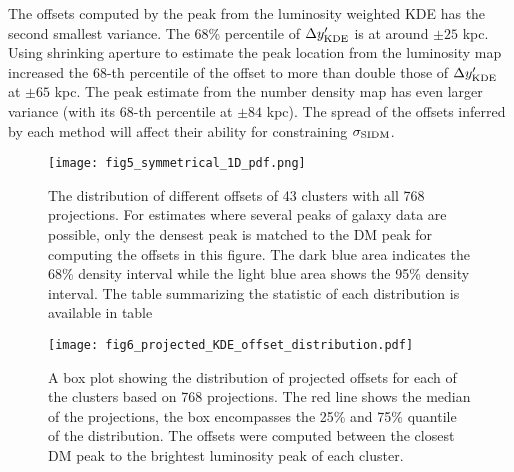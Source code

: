 The offsets computed by the peak from the luminosity weighted KDE 
has the second smallest variance. The 68\% percentile of $\Delta y_{\rm
KDE}'$ is at around $\pm 25$ kpc. Using shrinking aperture to estimate
the peak location from the luminosity map increased the 68-th percentile of the
offset to more than double those of $\Delta y_{\rm KDE}'$ at $\pm 65$ kpc.
The peak estimate from the number density map has even larger variance 
(with its 68-th percentile at $\pm 84$ kpc). 
The spread of the offsets inferred by each method will affect their ability
for constraining $\sigma_{\rm SIDM}$. 




\begin{figure*}
	\begin{center}
	\texttt{[image: fig5\_symmetrical\_1D\_pdf.png]}
	\caption{ 		
		The distribution of different offsets of 43 clusters with all 768
		projections. For estimates where several peaks of galaxy data are 
		possible, only the densest peak is matched to the DM peak for computing
		the offsets in this figure. 
		The dark blue area indicates the 68\% density interval
		while the light blue area shows the 95\% density interval. 
		The table summarizing the statistic of each distribution is available in
		table 
		\label{fig:offset_distributions}
	}
\end{center}
\end{figure*}

\begin{figure*}
	\begin{center}
	\texttt{[image: fig6\_projected\_KDE\_offset\_distribution.pdf]}
	\caption{A box plot showing the distribution of projected offsets for each of the clusters 
		based on 768 projections. The red line shows the median of the projections,
		the box encompasses the 25\% and 75\% quantile of the distribution.
		The offsets were computed between the closest DM 
		peak to the brightest luminosity peak of each cluster. 		
		\label{fig:projected_KDE_offset_distribution}
	}
\end{center}
\end{figure*}




